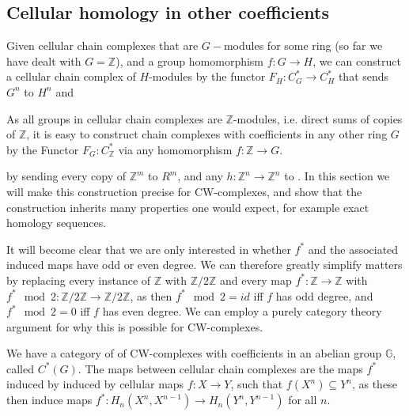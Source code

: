 \subsection{Cellular homology in other coefficients}


Given cellular chain complexes that are $G-$modules for some ring (so far we have dealt with $G=\mathbb{Z}$), and a group homomorphism $f:G\rightarrow H$, we can construct a cellular chain complex of $H$-modules by the functor $F_H:C^*_G\rightarrow C^*_H$ that sends $G^n$ to $H^n$ and 



As all groups in cellular chain complexes are $\mathbb{Z}$-modules, i.e. direct sums of copies of $\mathbb{Z}$, it is easy to construct chain complexes with coefficients in any other ring $G$ by the Functor $F_G:C^*_{\mathbb{Z}}$
via any homomorphism $f:\mathbb{Z}\rightarrow G$.

by sending every copy of $\mathbb{Z}^m$ to $R^m$, and any $h:\mathbb{Z}^n\rightarrow \mathbb{Z}^n$ to . In this section we will make this construction precise for CW-complexes, and show that the construction inherits many properties one would expect, for example exact homology sequences.

It will become clear that we are only interested in whether $f^*$ and the associated induced maps have odd or even degree. We can therefore greatly simplify matters by replacing every instance of $\mathbb{Z}$ with $\mathbb{Z}/2\mathbb{Z}$ and every map $f^*:\mathbb{Z}\rightarrow \mathbb{Z}$ with $f^* \mod 2:\mathbb{Z}/2\mathbb{Z}\rightarrow \mathbb{Z}/2\mathbb{Z}$, as then $f^* \mod 2=id$ iff $f$ has odd degree, and $f^* \mod 2=0$ iff $f$ has even degree. We can employ a purely category theory argument for why this is possible for CW-complexes.

We have a category of  of CW-complexes with coefficients in an abelian group $\mathbb{G}$, called $C^*(G)$. The maps between cellular chain complexes are the maps $f^*$ induced by induced by cellular maps $f:X\rightarrow Y$, such that $f(X^n)\subseteq Y^n$, as these then induce maps $f^*:H_n(X^n,X^{n-1})\rightarrow H_n(Y^n,Y^{n-1})$ for all $n$.

